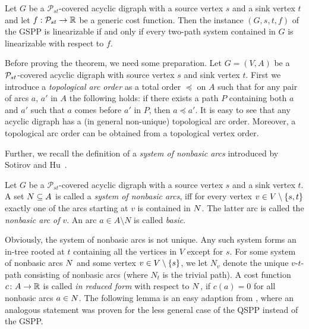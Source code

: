 \begin{theorem}
\label{thm_linearization_characterization}
Let $G$ be a $\mathcal{P}_{st}$-covered acyclic digraph with a source vertex $s$ and a sink vertex $t$ and  let $f : \mathcal{P}_{st} \rightarrow \mathbb{R}$ be a generic cost function. Then the instance $(G,s,t,f)$ of the GSPP  is linearizable if and only if every two-path system contained in $G$ is linearizable with respect to $f$.
\end{theorem}

 Before proving the theorem, we need some preparation. Let $G = (V,A)$ be a $\mathcal{P}_{st}$-covered acyclic digraph with source vertex $s$ and sink vertex $t$. First we introduce a \emph{topological arc order} as a total 
  order $\preceq$ on $A$ such that for any pair of  arcs $a$, $a'$ in $A$ the following holds:   if there  exists a path $P$  containing both $a$ and $a'$ such that $a$ comes before $a'$ in $P$, then $a\preceq a'$.  It is easy to see  that any acyclic digraph has a (in general non-unique)  topological arc order. Moreover, a topological arc order  can be obtained from a topological vertex order. 
 
 Further, we recall the definition of a \emph{system of nonbasic arcs}  introduced by  Sotirov and Hu~\cite{huSo2021}.  
 \begin{definition}\label{nonbasic:def}
 Let $G$ be a $\mathcal{P}_{st}$-covered acyclic digraph with a source vertex $s$ and a sink vertex $t$. A set $N \subseteq A$ is called a \emph{system of nonbasic arcs}, iff for every vertex $v \in V \setminus \{ s,t \}$ exactly one of the arcs starting at $v$ is contained in $N$. The latter  arc is called the \emph{nonbasic arc of $v$}. An arc $a \in A \setminus N$ is called \emph{basic}.
 \end{definition}
 Obviously, the system of nonbasic arcs is not unique.  Any such system  forms an in-tree rooted at $t$ containing   all the vertices in $V$ except for $s$. For some system of nonbasic arcs $N$ and some vertex $v \in V \setminus \{ s \}$, we let $N_v$ denote the unique $v$-$t$-path consisting  of nonbasic arcs (where $N_t$ is the trivial path).  A  cost function $c\colon A \rightarrow \mathbb{R}$ is called \emph{in reduced form} with respect to $N$, if $c(a) = 0$ for all nonbasic arcs $a \in N$. The following lemma is an easy adaption from \cite{huSo2021}, where an analogous statement was proven for the less general case of the QSPP instead of the GSPP.


